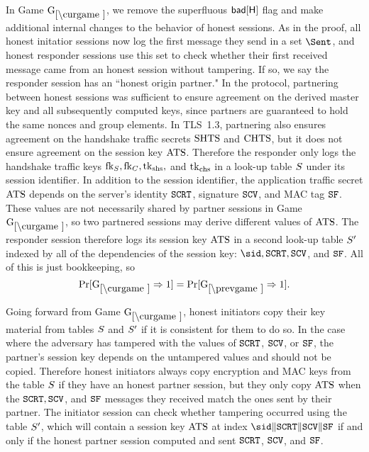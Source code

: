 \begin{collectinmacro}{\TLSProofFull}{}{}
In Game $\curGm$, we remove the superfluous $\bad[\Hash]$ flag and make additional internal changes to the behavior of honest sessions. 
As in the \SIGMAI proof, all honest initatior sessions now log the first message they send in a set $\Sent$, and honest responder sessions use this set to check whether their first received message came from an honest session without tampering. If so, we say the responder session has an ``honest origin partner."
In the \SIGMAI protocol, partnering between honest sessions was sufficient to ensure agreement on the derived master key and all subsequently computed keys, since partners are guaranteed to hold the same nonces and group elements. 
In TLS~1.3, partnering also ensures agreement on the handshake traffic secrets $\SHTS$ and $\CHTS$, but it does not ensure agreement on the session key $\ATS$. 
Therefore the responder only logs the handshake traffic keys $\SFK, \CFK, \tkshs,$ and $\tkchs$ in a look-up table $\S$ under its session identifier. 
In addition to the session identifier, the application traffic secret $\ATS$ depends on the server's identity $\sSCERT$, signature $\sSCERTV$, and MAC tag $\sSFIN$. 
These values are not necessarily shared by partner sessions in Game $\curGm$, so two partnered sessions may derive different values of $\ATS$.   
The responder session therefore logs its session key $\ATS$ in a second look-up table $\S'$ indexed by all of the dependencies of the session key: $\sid, \sSCERT,\sSCERTV$, and $\sSFIN$. 
All of this is just bookkeeping, so 
\[ \Pr[\curGm*\Rightarrow 1] = \Pr[\prevGm* \Rightarrow1].\]


Going forward from Game $\curGm$, honest initiators copy their key material from tables $\S$ and $\S'$ if it is consistent for them to do so.
In the case where the adversary has tampered with the values of $\sSCERT$, $\sSCERTV$, or $\sSFIN$, the partner's session key depends on the untampered values and should not be copied.
Therefore honest initiators always copy encryption and MAC keys from the table $\S$ if they have an honest partner session, but they only copy $\ATS$ when the $\sSCERT, \sSCERTV$, and $\sSFIN$ messages they received match the ones sent by their partner.
The initiator session can check whether tampering occurred using the table $\S'$, which will contain a session key $\ATS$ at index $\sid \conc \sSCERT \conc \sSCERTV \conc \sSFIN$ if and only if the honest partner session computed and sent $\sSCERT$, $\sSCERTV$, and $\sSFIN$.


\end{collectinmacro}
